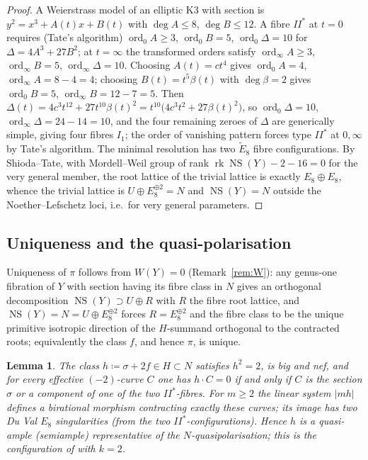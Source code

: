 \documentclass[11pt]{article}
\newtheorem{lemma}[theorem]{Lemma}
\DeclareMathOperator{\rk}{rk}
\DeclareMathOperator{\NS}{NS}
\begin{document}
\begin{proof}
A Weierstrass model of an elliptic K3 with section is
$y^2 = x^3 + A(t)x + B(t)$ with $\deg A\le 8$, $\deg B\le 12$. A fibre
$II^*$ at $t=0$ requires (Tate's algorithm)
$\operatorname{ord}_0 A\ge 3$, $\operatorname{ord}_0 B = 5$,
$\operatorname{ord}_0 \Delta =10$ for $\Delta=4A^3+27B^2$; at $t=\infty$
the transformed orders satisfy $\operatorname{ord}_\infty A\ge 3$,
$\operatorname{ord}_\infty B=5$, $\operatorname{ord}_\infty\Delta=10$.
Choosing $A(t)=ct^4$ gives $\operatorname{ord}_0 A=4$,
$\operatorname{ord}_\infty A = 8-4=4$; choosing $B(t)=t^5\beta(t)$ with
$\deg\beta=2$ gives $\operatorname{ord}_0 B=5$,
$\operatorname{ord}_\infty B=12-7=5$. Then
$\Delta(t)=4c^3 t^{12}+27 t^{10}\beta(t)^2
=t^{10}\bigl(4c^3 t^2+27\beta(t)^2\bigr)$,
so $\operatorname{ord}_0\Delta=10$, $\operatorname{ord}_\infty\Delta=
24-14=10$, and the four remaining zeroes of $\Delta$ are generically simple,
giving four fibres $I_1$; the order of vanishing pattern forces type $II^*$
at $0,\infty$ by Tate's algorithm. The minimal resolution has two $\tilde
E_8$ fibre configurations. By Shioda--Tate, with Mordell--Weil group of
rank $\rk\NS(Y)-2-16=0$ for the very general member, the root lattice of
the trivial lattice is exactly $E_8\oplus E_8$, whence the trivial lattice
is $U\oplus E_8^{\oplus 2}=N$ and $\NS(Y)=N$ outside the
Noether--Lefschetz loci, i.e.\ for very general parameters.
\end{proof}

\subsection{Uniqueness and the quasi-polarisation}

Uniqueness of $\pi$ follows from $W(Y)=0$ (Remark~\ref{rem:W}): any
genus-one fibration of $Y$ with section having its fibre class in $N$ gives
an orthogonal decomposition $\NS(Y)\supset U\oplus R$ with $R$ the fibre
root lattice, and $\NS(Y)=N=U\oplus E_8^{\oplus2}$ forces $R=E_8^{\oplus2}$
and the fibre class to be the unique primitive isotropic direction of the
$H$-summand orthogonal to the contracted roots; equivalently the class $f$,
and hence $\pi$, is unique.

\begin{lemma}\label{lem:quasi}
The class $h\coloneqq\sigma+2f\in H\subset N$ satisfies $h^2=2$, is big and
nef, and for every effective $(-2)$-curve $C$ one has $h\cdot C=0$ if and
only if $C$ is the section $\sigma$ or a component of one of the two
$II^*$-fibres. For $m\ge 2$ the linear system $|mh|$ defines a birational
morphism contracting exactly these curves; its image has two Du Val $E_8$
singularities (from the two $II^*$-configurations). Hence $h$ is a
quasi-ample (semiample) representative of the $N$-quasipolarisation; this
is the configuration of {} with $k=2$.
\end{lemma}
\end{document}
